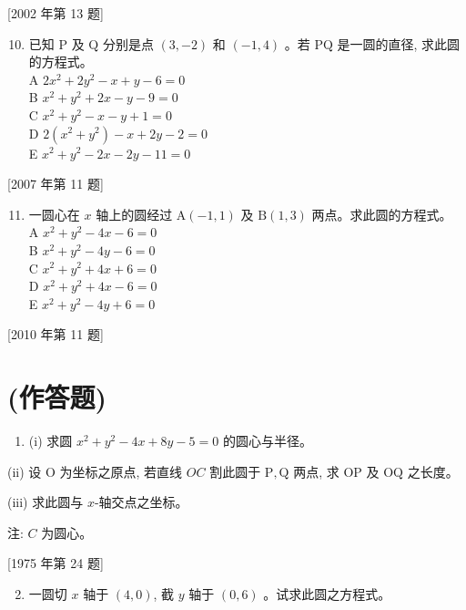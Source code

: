 \documentclass[10pt]{article}
\begin{document}
[2002 年第 13 题]

\begin{enumerate}
  \setcounter{enumi}{9}
  \item 已知 $\mathrm{P}$ 及 $\mathrm{Q}$ 分别是点 $(3,-2)$ 和 $(-1,4)$ 。若 $\mathrm{PQ}$ 是一圆的直径, 求此圆的方程式。\\
A $2 x^{2}+2 y^{2}-x+y-6=0$\\
B $x^{2}+y^{2}+2 x-y-9=0$\\
C $x^{2}+y^{2}-x-y+1=0$\\
D $2\left(x^{2}+y^{2}\right)-x+2 y-2=0$\\
E $x^{2}+y^{2}-2 x-2 y-11=0$
\end{enumerate}

[2007 年第 11 题]

\begin{enumerate}
  \setcounter{enumi}{10}
  \item 一圆心在 $x$ 轴上的圆经过 $\mathrm{A}(-1,1)$ 及 $\mathrm{B}(1,3)$ 两点。求此圆的方程式。\\
A $x^{2}+y^{2}-4 x-6=0$\\
B $x^{2}+y^{2}-4 y-6=0$\\
C $x^{2}+y^{2}+4 x+6=0$\\
D $x^{2}+y^{2}+4 x-6=0$\\
E $x^{2}+y^{2}-4 y+6=0$
\end{enumerate}

[2010 年第 11 题]

\section*{(作答题)}
\begin{enumerate}
  \item (i) 求圆 $x^{2}+y^{2}-4 x+8 y-5=0$ 的圆心与半径。
\end{enumerate}

(ii) 设 $\mathrm{O}$ 为坐标之原点, 若直线 $O C$ 割此圆于 $\mathrm{P}, \mathrm{Q}$ 两点, 求 $\mathrm{OP}$ 及 $\mathrm{OQ}$ 之长度。

(iii) 求此圆与 $x$-轴交点之坐标。

注: $C$ 为圆心。

[1975 年第 24 题]

\begin{enumerate}
  \setcounter{enumi}{1}
  \item 一圆切 $x$ 轴于 $(4,0)$, 截 $y$ 轴于 $(0,6)$ 。试求此圆之方程式。
\end{enumerate}
\end{document}

